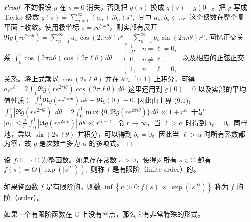 \begin{proof}
	不妨假设 $g$ 在 $s=0$ 消失，否则把 $g(s)$ 换成 $g(s)-g(0)$。把 $g$ 写成 Taylor 级数
	\(\textstyle g(s)=\allowbreak{}\sum_{n=\allowbreak{}1}^{\infty}(a_n+\allowbreak{}ib_n)s^n,\allowbreak{}\)
	其中 $a_n,b_n\in\mathbb R$。这个级数在整个复平面上收敛。使用极坐标
	$s=re^{2\pi i\theta}$，则实部有展开
	\(\textstyle \Re g(re^{2\pi i\theta}) =\allowbreak{} \sum_{n=\allowbreak{}1}^{\infty}a_n\cos(2\pi n\theta)r^n - \sum_{n=\allowbreak{}1}^{\infty}b_n\sin(2\pi n\theta)r^n.\)
	回忆正交关系
	\(\textstyle \int_0^1 \cos(2\pi n\theta)\cos(2\pi \ell\theta)\,d\theta = \begin{cases} \frac12, & n=\ell\neq0,\\ 0, & n\neq \ell,\\ 1, & n=\ell=0, \end{cases}\)
	以及相应的正弦正交关系。将上式乘以 $\cos(2\pi \ell\theta)$ 并在 $\theta\in[0,1]$ 上积分，可得
	\(\textstyle a_\ell r^\ell =\allowbreak{} 2\int_0^1 \Re g(re^{2\pi i\theta})\cos(2\pi\ell\theta)\,d\theta.\)
	这里还用到 $g(0)=0$ 以及实部的平均值性质：
	\(\textstyle \int_0^1 \Re g(re^{2\pi i\theta})\,d\theta=\allowbreak{}\Re g(0)=\allowbreak{}0.\)
	因此由上界 (9.1)，
	\(\textstyle \int_0^1 |\Re g(re^{2\pi i\theta})|\,d\theta =\allowbreak{} 2\int_0^1 \max\{0,\allowbreak{}\Re g(re^{2\pi i\theta})\}\,d\theta \ll\allowbreak{} 1+\allowbreak{}r^\alpha.\)
	于是
	\(\textstyle |a_\ell| \leq\allowbreak{} \frac{2}{r^\ell} \int_0^1 |\Re g(re^{2\pi i\theta})|\,d\theta \ll\allowbreak{} r^{\alpha-\ell}.\)
	令 $r\to\infty$，当 $\ell>\alpha$ 时得到 $a_\ell=0$。同样地，乘以 $\sin(2\pi\ell\theta)$ 并积分，可以得到 $b_\ell=0$。因此当 $\ell>\alpha$ 时所有系数都为零，故 $g$ 是次数至多为 $\alpha$ 的多项式。
\end{proof}

\begin{definition}[有限阶函数]
	设 $f:\mathbb C\to\mathbb C$ 为整函数。如果存在常数 $\alpha>0$，使得对所有 $s\in\mathbb C$ 都有
	\(\textstyle f(s)=\allowbreak{}O\left(\exp(|s|^\alpha)\right),\allowbreak{}\)
	则称 $f$ 是有限阶（finite order）的。
\end{definition}

\begin{definition}[阶]
	如果整函数 $f$ 是有限阶的，则数
	\(\textstyle \inf\left\{ \alpha>0: f(s)\ll\allowbreak{} \exp(|s|^\alpha) \right\}\)
	称为 $f$ 的阶（order）。
\end{definition}

如果一个有限阶函数在 $\mathbb C$ 上没有零点，那么它有非常特殊的形式。

